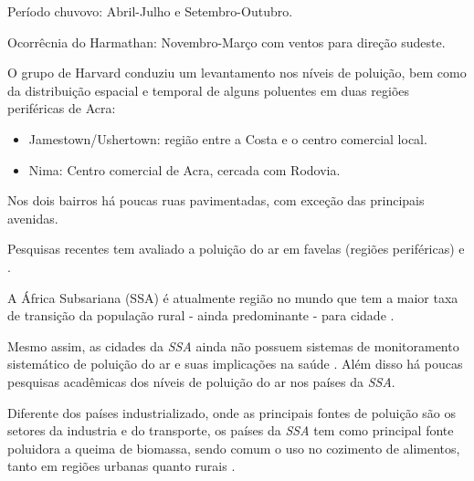 Período chuvovo: Abril-Julho e Setembro-Outubro.

Ocorrêcnia do Harmathan: Novembro-Março com ventos para direção sudeste.

O grupo de Harvard \citep{ARKU2008} conduziu um levantamento nos níveis de 
poluição, bem como da distribuição espacial e temporal de alguns poluentes 
em duas regiões periféricas de Acra: 
\citep{DIONISIO2010}

\begin{itemize}
  \item Jamestown/Ushertown: região entre a Costa e o centro comercial local.
  \item Nima: Centro comercial de Acra, cercada com Rodovia.
\end{itemize} 

Nos dois bairros há poucas ruas pavimentadas, com exceção das principais 
avenidas. 

Pesquisas recentes tem avaliado a poluição do ar em favelas 
(regiões periféricas) \citep{SCLAR2005} e \citep{RILEY2007}. 

A África Subsariana (SSA) é atualmente região no mundo que tem a maior taxa de 
transição da população rural - ainda predominante - para cidade 
\citep{MONTGOMERY2008}.

Mesmo assim, as cidades da \textit{SSA} ainda não possuem sistemas de 
monitoramento sistemático de poluição do ar e suas implicações na saúde 
\citep{EZZATI2004}. 
Além disso há poucas pesquisas acadêmicas dos níveis de poluição do ar nos 
países da \textit{SSA}.

Diferente dos países industrializado, onde as principais fontes de poluição 
são os setores da industria e do transporte, os países da \textit{SSA} tem como 
principal fonte poluidora a queima de biomassa, sendo comum o uso no cozimento 
de alimentos, tanto em regiões urbanas quanto rurais \citep{SMITH2004}.
